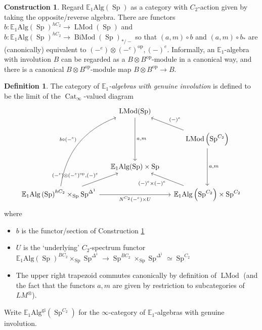 \documentclass{article}
\DeclareMathOperator{\Cat}{Cat} %
\DeclareMathOperator{\LMod}{LMod} %
\DeclareMathOperator{\BiMod}{BiMod} %
\DeclareMathOperator{\Spectra}{Sp} %
\newcommand{\op}{\mathrm{op}}
\theoremstyle{definition}
\newtheorem{definition}[equation]{Definition}
\newtheorem{construction}[equation]{Construction}
\begin{document}
\begin{construction}\label{cons:alg_inv_is_bimod_canonically}
   Regard $ \mathbb{E}_1\mathrm{Alg}(\Spectra) $ as a category with $ C_2 $-action given by taking the opposite/reverse algebra.  
   There are functors $ b \colon \mathbb{E}_1\mathrm{Alg}\left(\Spectra\right)^{hC_2} \to \LMod(\Spectra) $ and $ b \colon \mathbb{E}_1\mathrm{Alg}\left(\Spectra\right)^{hC_2} \to \BiMod(\Spectra)_{*/-} $ so that $ (a, m) \circ b $ and $ (a, m)\circ b_* $ are (canonically) equivalent to $ (-^e) \otimes(-^ e)^\mathrm{op}, (-)^e $. 
   Informally, an $ \mathbb{E}_1 $-algebra with involution $ B $ can be regarded as a $ B \otimes B^\op $-module in a canonical way, and there is a canonical $ B \otimes B^\op $-module map $ B \otimes B^\op \to B $. 
\end{construction}
\begin{definition}
   The category of \emph{$\mathbb{E}_1$-algebras with genuine involution} is defined to be the limit of the $\Cat_\infty$-valued diagram 
   \begin{equation}\label{diagram:E1_alg_gen_involution}
   \begin{tikzcd}[column sep=small]
       & \LMod(\Spectra) \ar[dd,"{a,m}"]  & \\
       & & \LMod\left(\Spectra^{C_2}\right) \ar[dd,"{a, m}"] \ar[lu,"{(-)^e}"'] \\
       &\mathbb{E}_1\mathrm{Alg}(\Spectra) \times \Spectra & \\
       \mathbb{E}_1\mathrm{Alg}\left(\Spectra\right)^{hC_2} \times_{\Spectra} \Spectra^{\Delta^1}  \ar[rr,"{N^{C_2}(-^e) \times U}"'] \ar[ru,"{(-^e) \otimes(-^ e)^\mathrm{op}, (-)^e}"] \ar[ruuu,"{b \circ (-^e)}", bend left=30] & &\mathbb{E}_1\mathrm{Alg}\left(\Spectra^{C_2}\right) \times \Spectra^{C_2} \ar[lu,"{(-)^e \times (-)^e}"]
   \end{tikzcd}
   \end{equation}
   where
   \begin{itemize}
       \item $ b $ is the functor/section of Construction \ref{cons:alg_inv_is_bimod_canonically} 
       \item $ U $ is the `underlying' $C_2$-spectrum functor $ \mathbb{E}_1\mathrm{Alg}\left(\Spectra\right)^{BC_2} \times_{\Spectra} \Spectra^{\Delta^1} \to \Spectra^{BC_2} \times_{\Spectra} \Spectra^{\Delta^1} \simeq \Spectra^{C_2} $ 
       \item The upper right trapezoid commutes canonically by definition of $ \LMod $ (and the fact that the functors $ a, m $ are given by restriction to subcategories of $ LM^\otimes $). 
   \end{itemize}
   Write $ \mathbb{E}_1\mathrm{Alg}^{\mathrm{gi}}\left(\Spectra^{C_2}\right) $ for the $\infty $-category of $\mathbb{E}_1$-algebras with genuine involution. 
\end{definition}
\end{document}
